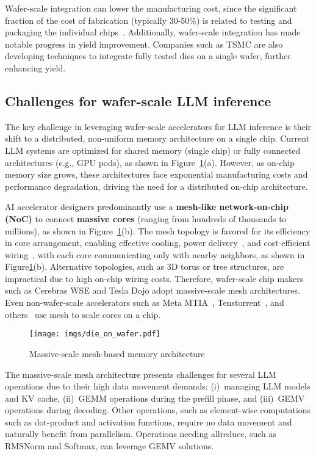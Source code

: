  Wafer-scale integration can lower the manufacturing cost, since the significant fraction of the cost of fabrication (typically 30-50\%) is related to testing and packaging the individual chips~\cite{wiki:waferscale}. 
Additionally, wafer-scale integration has made notable progress in yield improvement. Companies such as TSMC are also developing techniques to integrate fully tested dies on a single wafer, further enhancing yield.
\vspace{-0.2cm}
\subsection{Challenges for wafer-scale LLM inference}

The key challenge in leveraging wafer-scale accelerators for LLM inference is their shift to a distributed, non-uniform memory architecture on a single chip. Current LLM systems are optimized for shared memory (single chip) or fully connected architectures (e.g., GPU pods), as shown in Figure~\ref{fig:mesh-architecture}(a). However, as on-chip memory size grows, these architectures face exponential manufacturing costs and performance degradation, driving the need for a distributed on-chip architecture.

AI accelerator designers predominantly use a \textbf{mesh-like network-on-chip (NoC)} to connect \textbf{massive cores} (ranging from hundreds of thousands to millions), as shown in Figure~\ref{fig:mesh-architecture}(b). The mesh topology is favored for its efficiency in core arrangement, enabling effective cooling\cite{cooling}, power delivery~\cite{powerdelivery}, and cost-efficient wiring~\cite{chip-cost-1, chip-cost-2}, with each core communicating only with nearby neighbors, as shown in Figure\ref{fig:mesh-architecture}(b). Alternative topologies, such as 3D torus or tree structures, are impractical due to high on-chip wiring costs. Therefore, wafer-scale chip makers such as Cerebras WSE\cite{wse} and Tesla Dojo\cite{dojo} adopt massive-scale mesh architectures. Even non-wafer-scale accelerators such as Meta MTIA~\cite{mtia}, Tenstorrent~\cite{tenstorrent}, and others~\cite{amd-xdna, azure-maia} use mesh to scale cores on a chip.

\begin{figure}[t]
    \centering
    \texttt{[image: imgs/die\_on\_wafer.pdf]}
    \vspace{-3mm}
    \caption{Massive-scale mesh-based memory architecture}
    \vspace{-3mm}
    \label{fig:mesh-architecture}
\end{figure}

The massive-scale mesh architecture presents challenges for several LLM operations due to their high data movement demands: (i)~managing LLM models and KV cache, (ii)~GEMM operations during the prefill phase, and (iii)~GEMV operations during decoding. Other operations, such as element-wise computations such as dot-product and activation functions, require no data movement and naturally benefit from parallelism. Operations needing allreduce, such as RMSNorm and Softmax, can leverage GEMV solutions.